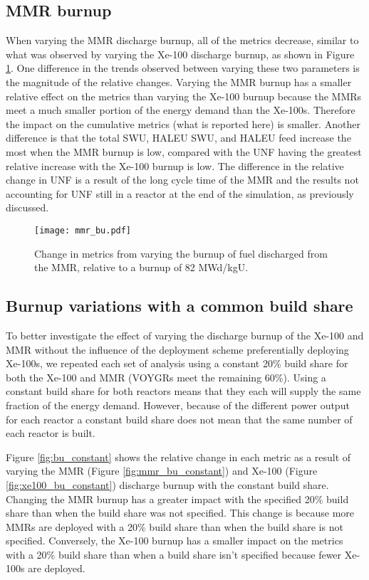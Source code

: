 \subsection{MMR burnup}
When varying the \gls{MMR} discharge burnup, all of the metrics decrease, similar 
to what was observed by varying the Xe-100 discharge burnup, as shown in 
Figure \ref{fig:mmr_bu_s7}. One difference in 
the trends observed between varying these two parameters is the magnitude of 
the relative changes. Varying the \gls{MMR} burnup has a smaller relative effect 
on the metrics than varying the Xe-100 burnup because the \glspl{MMR}
meet a much smaller portion of the energy demand than the Xe-100s.
Therefore the impact on the cumulative metrics 
(what is reported here) is smaller. Another difference is that the total 
\gls{SWU}, \gls{HALEU} \gls{SWU}, and \gls{HALEU} feed increase the most 
when the \gls{MMR} burnup is low, compared with the \gls{UNF} having the 
greatest relative increase with the Xe-100 burnup is low. The difference 
in the relative change in \gls{UNF} is a result of the long cycle 
time of the \gls{MMR} and the results not accounting for 
\gls{UNF} still in a reactor at the end of the simulation, 
as previously discussed. 

\begin{figure}[h!]
    \centering
    \texttt{[image: mmr\_bu.pdf]}
    \caption{Change in metrics from varying the burnup of fuel 
    discharged from the MMR, relative to a burnup of 82 MWd/kgU.}
    \label{fig:mmr_bu_s7}
\end{figure}

\subsection{Burnup variations with a common build share}
To better investigate the effect of varying the discharge burnup of the Xe-100 
and \gls{MMR} without the influence of the deployment scheme preferentially
deploying Xe-100s, we repeated each set of analysis using a constant 20\% 
build share for both the Xe-100 and \gls{MMR} (VOYGRs meet the remaining 60\%). 
Using a constant build share for 
both reactors means that they each will supply the same fraction of the energy demand.
However, because of the different power output for each reactor a constant build 
share does not mean that the same number of each reactor is built. 

Figure \ref{fig:bu_constant} shows the relative change in each metric as a result 
of varying the \gls{MMR} (Figure \ref{fig:mmr_bu_constant}) and Xe-100 
(Figure \ref{fig:xe100_bu_constant}) discharge burnup with the constant build 
share. Changing the \gls{MMR} burnup has a greater impact with the specified 20\% 
build share than when the build share was not specified. This change is because 
more \glspl{MMR} are deployed with a 20\% build share than when the build share is 
not specified. Conversely, the Xe-100 burnup has a smaller impact on the metrics 
with a 20\% build share than when a build share isn't specified because fewer 
Xe-100s are deployed. 

